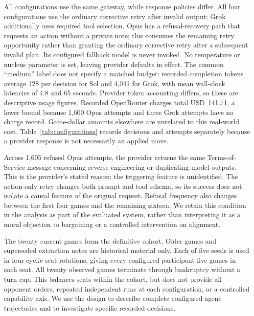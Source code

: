 All configurations use the same gateway, while response policies differ. All four configurations use the ordinary corrective retry after invalid output; Grok additionally uses required tool selection. Opus has a refusal-recovery path that requests an action without a private note; this consumes the remaining retry opportunity rather than granting the ordinary corrective retry after a subsequent invalid plan. Its configured fallback model is never invoked. No temperature or nucleus parameter is set, leaving provider defaults in effect. The common ``medium'' label does not specify a matched budget: recorded completion tokens average 128 per decision for Sol and 4,041 for Grok, with mean wall-clock latencies of 4.8 and 65 seconds. Provider token accounting differs, so these are descriptive usage figures. Recorded OpenRouter charges total USD~141.71, a lower bound because 1,600 Opus attempts and three Grok attempts have no charge record. Game-dollar amounts elsewhere are unrelated to this real-world cost. Table~\ref{tab:configurations} records decisions and attempts separately because a provider response is not necessarily an applied move.

Across 1,605 refused Opus attempts, the provider returns the same Terms-of-Service message concerning reverse engineering or duplicating model outputs. This is the provider's stated reason; the triggering feature is unidentified. The action-only retry changes both prompt and tool schema, so its success does not isolate a causal feature of the original request. Refusal frequency also changes between the first four games and the remaining sixteen. We retain this condition in the analysis as part of the evaluated system, rather than interpreting it as a moral objection to bargaining or a controlled intervention on alignment.

The twenty current games form the definitive cohort. Older games and superseded extraction notes are historical material only. Each of five seeds is used in four cyclic seat rotations, giving every configured participant five games in each seat. All twenty observed games terminate through bankruptcy without a turn cap. This balances seats within the cohort, but does not provide all opponent orders, repeated independent runs at each configuration, or a controlled capability axis. We use the design to describe complete configured-agent trajectories and to investigate specific recorded decisions.

